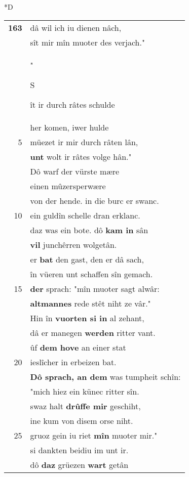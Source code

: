 \documentclass[8pt,a4paper,notitlepage]{article}
\begin{document}
\begin{table}[ht]
\begin{minipage}[t]{0.5\linewidth}
\small
\begin{center}*D
\end{center}
\begin{tabular}{rl}
\textbf{163} & dâ wil ich iu dienen nâch,\\ 
 & sît mir mîn muoter des verjach."\\ 
 & "\begin{large}S\end{large}ît ir durch râtes schulde\\ 
 & her komen, iwer hulde\\ 
5 & müezet ir mir durch râten lân,\\ 
 & \textbf{unt} wolt ir râtes volge hân."\\ 
 & Dô warf der vürste mære\\ 
 & einen mûzersperwære\\ 
 & von der hende. in die burc er swanc.\\ 
10 & ein guldîn schelle dran erklanc.\\ 
 & daz was ein bote. dô \textbf{kam in} sân\\ 
 & \textbf{vil} junchêrren wolgetân.\\ 
 & er \textbf{bat} den gast, den er dâ sach,\\ 
 & în vüeren unt schaffen sîn gemach.\\ 
15 & \textbf{der} sprach: "mîn muoter sagt alwâr:\\ 
 & \textbf{altmannes} rede stêt niht ze vâr."\\ 
 & Hin în \textbf{vuorten si in} al zehant,\\ 
 & dâ er manegen \textbf{werden} ritter vant.\\ 
 & ûf \textbf{dem hove} an einer stat\\ 
20 & ieslîcher in erbeizen bat.\\ 
 & \textbf{Dô sprach, an dem} was tumpheit schîn:\\ 
 & "mich hiez ein künec ritter sîn.\\ 
 & swaz halt \textbf{drûffe mir} geschiht,\\ 
 & ine kum von disem orse niht.\\ 
25 & gruoz gein iu riet \textbf{mîn} muoter mir."\\ 
 & si dankten beidiu im unt ir.\\ 
 & dô \textbf{daz} grüezen \textbf{wart} getân\\ 

\end{tabular}
\end{minipage}
\end{table}
\end{document}
